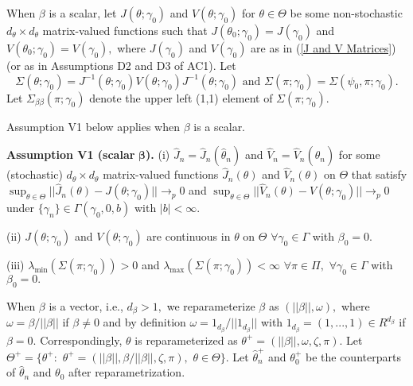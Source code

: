 \documentclass[12pt,titlepage,final,oneside,letterpaper]{article}
\begin{document}
When $\beta $ is a scalar, let $J(\theta ;\gamma _{0})$ and $V(\theta
;\gamma _{0})$ for $\theta \in \Theta $ be some non-stochastic $d_{\theta
}\times d_{\theta }$ matrix-valued functions such that $J(\theta _{0};\gamma
_{0})=J(\gamma _{0})$ and $V(\theta _{0};\gamma _{0})=V(\gamma _{0}),$ where 
$J(\gamma _{0})$ and $V(\gamma _{0})$ are as in (\ref{J and V Matrices}) (or
as in Assumptions D2 and D3 of AC1). Let 
\begin{equation}
\Sigma (\theta ;\gamma _{0})=J^{-1}(\theta ;\gamma _{0})V(\theta ;\gamma
_{0})J^{-1}(\theta ;\gamma _{0})\text{ and }\Sigma (\pi ;\gamma _{0})=\Sigma
(\psi _{0},\pi ;\gamma _{0}).  \label{Sigma defn scalar beta}
\end{equation}%
Let $\Sigma _{\beta \beta }(\pi ;\gamma _{0})$ denote the upper left (1,1)
element of $\Sigma (\pi ;\gamma _{0}).$

Assumption V1 below applies when $\beta $ is a scalar.\medskip

\noindent \textbf{Assumption V1 (scalar }$\mathbf{\beta }$\textbf{). }(i) $%
\widehat{J}_{n}=\widehat{J}_{n}(\widehat{\theta }_{n})$ and $\widehat{V}_{n}=%
\widehat{V}_{n}(\widehat{\theta }_{n})$ for some (stochastic) $d_{\theta
}\times d_{\theta }$ matrix-valued functions $\widehat{J}_{n}(\theta )$ and $%
\widehat{V}_{n}(\theta )$ on $\Theta $ that satisfy $\sup_{\theta \in \Theta
}||\widehat{J}_{n}(\theta )-J(\theta ;\gamma _{0})||\rightarrow _{p}0$ and $%
\sup_{\theta \in \Theta }||\widehat{V}_{n}(\theta )-V(\theta ;\gamma
_{0})||\rightarrow _{p}0$ under $\{\gamma _{n}\}\in \Gamma (\gamma _{0},0,b)$
with $|b|<\infty .$

\noindent (ii) $J(\theta ;\gamma _{0})$ and $V(\theta ;\gamma _{0})$ are
continuous in $\theta $ on $\Theta $ $\forall \gamma _{0}\in \Gamma $ with $%
\beta _{0}=0.$

\noindent (iii) $\lambda _{\min }(\Sigma (\pi ;\gamma _{0}))>0$ and $\lambda
_{\max }(\Sigma (\pi ;\gamma _{0}))<\infty $ $\forall \pi \in \Pi ,$ $%
\forall \gamma _{0}\in \Gamma $ with $\beta _{0}=0.$\medskip

When $\beta $ is a vector, i.e., $d_{\beta }>1,$ we reparameterize $\beta $
as $(||\beta ||,\omega ),$ where $\omega =\beta /||\beta ||$ if $\beta \neq
0 $ and by definition $\omega =1_{d_{\beta }}/||1_{d_{\beta }}||$ with $%
1_{d_{\beta }}=(1,...,1)\in R^{d_{\beta }}$ if $\beta =0.$ Correspondingly, $%
\theta $ is reparameterized as $\theta ^{+}=(||\beta ||,\omega ,\zeta ,\pi
). $ Let $\Theta ^{+}=\{\theta ^{+}:$ $\theta ^{+}=(||\beta ||,\beta
/||\beta ||,\zeta ,\pi ),$ $\theta \in \Theta \}.$ Let $\widehat{\theta }%
_{n}^{+}$ and $\theta _{0}^{+}$ be the counterparts of $\widehat{\theta }%
_{n} $ and $\theta _{0}$ after reparametrization.
\end{document}
